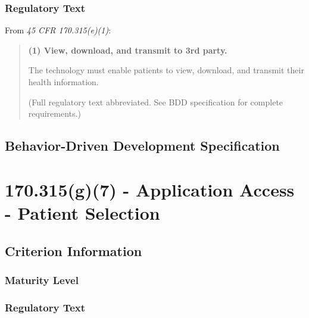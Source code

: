 \subsection{Regulatory Text}

From \textit{45 CFR \textsection{} 170.315(e)(1)}:

\begin{quotation}
\textbf{(1) View, download, and transmit to 3rd party.}

The technology must enable patients to view, download, and transmit their health information.

(Full regulatory text abbreviated. See BDD specification for complete requirements.)
\end{quotation}

\section{Behavior-Driven Development Specification}




\chapter{\textsection{} 170.315(g)(7) - Application Access - Patient Selection}
\label{chap:g7}


\section{Criterion Information}

\subsection{Maturity Level}

\subsection{Regulatory Text}

